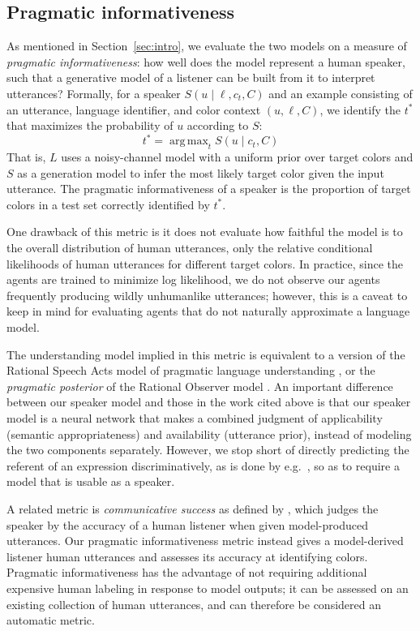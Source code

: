 \documentclass[11pt,a4paper]{article}
\renewcommand{\|}{\mid}
\DeclareMathOperator*{\argmax}{arg\,max}
\newcommand{\secref}[1]{Section~\ref{#1}}
\begin{document}
\subsection{Pragmatic informativeness} \label{sec:metric}

As mentioned in \secref{sec:intro}, we evaluate the two models on a measure of \emph{pragmatic informativeness}: how well does
the model represent a human speaker, such that a generative model of a listener can be built from it to interpret utterances?
Formally, for a speaker $S(u \| \ell, c_t, C)$ and an example consisting of an utterance, language identifier, and
color context $(u, \ell, C)$, we identify the $t^*$ that maximizes the probability of $u$ according to $S$:
\[t^* = \argmax_t S(u \| c_t, C)\]
That is, $L$ uses a noisy-channel model with a uniform prior over target colors and $S$ as a generation model to infer the most likely target color given the input utterance. The pragmatic informativeness of a speaker is the proportion of target colors in a test set correctly identified by $t^*$.

One drawback of this metric is it does not evaluate how faithful the model is to the overall distribution of human utterances, only the relative conditional likelihoods of human utterances for different target colors. In practice, since the agents are trained to minimize log likelihood, we do not observe our agents frequently producing wildly unhumanlike utterances; however, this is a caveat to keep in mind for evaluating agents that do not naturally approximate a language model.

The understanding model implied in this metric is equivalent to a version of the Rational Speech Acts model of pragmatic language understanding \cite{Frank2012,GoodmanFrank16_RSATiCS}, or the \emph{pragmatic posterior} of the
Rational Observer model \cite{McMahan:Stone:2015}. An important difference between our 
speaker model and those in the work cited above is that our speaker model is a neural 
network that makes a combined judgment of applicability (semantic appropriateness) and 
availability (utterance prior), instead of modeling the two components separately.
However, we stop short of directly predicting the referent of an expression
discriminatively, as is done by e.g.\ \citet{Kennington2015}, so as to require a
model that is usable as a speaker.

A related metric is \emph{communicative success} as defined by \citet{Golland2010}, which judges the speaker by the accuracy of a human listener when given model-produced utterances. Our pragmatic informativeness metric instead gives a model-derived listener human utterances and assesses its accuracy at identifying colors. Pragmatic informativeness has the advantage of not requiring additional expensive human labeling in response to model outputs; it can be assessed on an existing collection of human utterances, and can therefore be considered an automatic metric.
\end{document}
